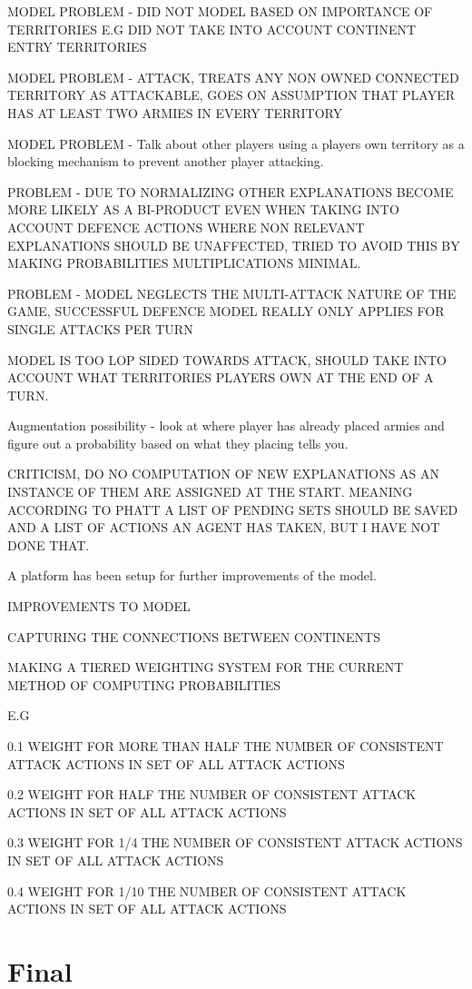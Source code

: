 \documentclass[parskip]{cs4rep}
\begin{document}
MODEL PROBLEM - DID NOT MODEL BASED ON IMPORTANCE OF TERRITORIES E.G DID NOT TAKE INTO ACCOUNT CONTINENT ENTRY TERRITORIES

MODEL PROBLEM - ATTACK, TREATS ANY NON OWNED CONNECTED TERRITORY AS ATTACKABLE, GOES ON ASSUMPTION THAT PLAYER HAS AT LEAST TWO ARMIES IN EVERY TERRITORY

MODEL PROBLEM - Talk about other players using a players own territory as a blocking mechanism to prevent another player attacking.

PROBLEM - DUE TO NORMALIZING OTHER EXPLANATIONS BECOME MORE LIKELY AS A BI-PRODUCT EVEN WHEN TAKING INTO ACCOUNT DEFENCE ACTIONS WHERE NON RELEVANT EXPLANATIONS SHOULD BE UNAFFECTED, TRIED TO AVOID THIS BY MAKING PROBABILITIES MULTIPLICATIONS MINIMAL.

PROBLEM - MODEL NEGLECTS THE MULTI-ATTACK NATURE OF THE GAME, SUCCESSFUL DEFENCE MODEL REALLY ONLY APPLIES FOR SINGLE ATTACKS PER TURN

MODEL IS TOO LOP SIDED TOWARDS ATTACK, SHOULD TAKE INTO ACCOUNT WHAT TERRITORIES PLAYERS OWN AT THE END OF A TURN.

Augmentation possibility - look at where player has already placed armies and figure out a probability based on what they placing tells you.

CRITICISM, DO NO COMPUTATION OF NEW EXPLANATIONS AS AN INSTANCE OF THEM ARE ASSIGNED AT THE START. MEANING ACCORDING TO PHATT A LIST OF PENDING SETS SHOULD BE SAVED AND A LIST OF ACTIONS AN AGENT HAS TAKEN, BUT I HAVE NOT DONE THAT.

A platform has been setup for further improvements of the model.

IMPROVEMENTS TO MODEL

CAPTURING THE CONNECTIONS BETWEEN CONTINENTS

MAKING A TIERED WEIGHTING SYSTEM FOR THE CURRENT METHOD OF COMPUTING PROBABILITIES

E.G 

0.1 WEIGHT FOR MORE THAN HALF THE NUMBER OF CONSISTENT ATTACK ACTIONS IN SET OF ALL ATTACK ACTIONS

0.2 WEIGHT FOR HALF THE NUMBER OF CONSISTENT ATTACK ACTIONS IN SET OF ALL ATTACK ACTIONS

0.3 WEIGHT FOR 1/4 THE NUMBER OF CONSISTENT ATTACK ACTIONS IN SET OF ALL ATTACK ACTIONS

0.4 WEIGHT FOR 1/10 THE NUMBER OF CONSISTENT ATTACK ACTIONS IN SET OF ALL ATTACK ACTIONS

\section{Final}
\end{document}
